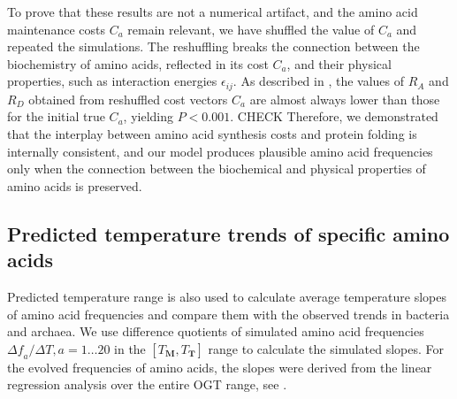 \documentclass[10pt,letterpaper]{article}
\begin{document}

To prove that these results are not a numerical artifact, and the amino acid maintenance costs $C_a$ remain relevant, we have shuffled the value of $C_a$ and repeated the simulations. The reshuffling breaks the connection between the biochemistry of amino acids, reflected  in its cost $C_a$, and their physical properties, such as interaction energies $\epsilon_{ij}$. As described in , the values of $R_A$ and $R_D$ obtained from reshuffled cost vectors $C_a$ are almost always lower than those for the initial true $C_a$, yielding $P<0.001$. CHECK Therefore, we demonstrated that the interplay between amino acid synthesis costs and protein folding is internally consistent, and our model produces plausible amino acid frequencies only when the connection between the biochemical and physical properties of amino acids is preserved.

 

\subsection*{Predicted temperature trends of specific amino acids}
    
Predicted temperature range is also used to calculate average temperature slopes of amino acid frequencies and compare them with the observed trends in bacteria and archaea. We use difference quotients of simulated amino acid frequencies $\Delta\mathit{f}_{a}/\Delta T, a=1\dots20$ in the $[T_{\mathbf{M}},T_{\mathbf{T}}]$ range to calculate the simulated slopes. For the evolved frequencies of amino acids, the slopes were derived from the  linear regression analysis over the entire OGT range, see .
\end{document}
